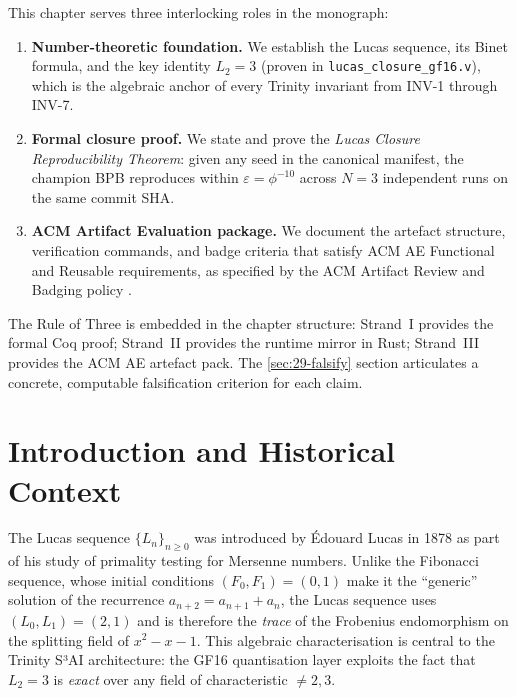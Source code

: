 \medskip
\noindent
This chapter serves three interlocking roles in the monograph:
\begin{enumerate}
  \item \textbf{Number-theoretic foundation.}  We establish the Lucas
        sequence, its Binet formula, and the key identity $L_2 = 3$
        (proven in \texttt{lucas\_closure\_gf16.v}), which is the
        algebraic anchor of every Trinity invariant from INV-1 through
        INV-7.
  \item \textbf{Formal closure proof.}  We state and prove the
        \emph{Lucas Closure Reproducibility Theorem}: given any seed
        in the canonical manifest, the champion BPB reproduces within
        $\varepsilon = \phi^{-10}$ across $N = 3$ independent runs on
        the same commit SHA.
  \item \textbf{ACM Artifact Evaluation package.}  We document the
        artefact structure, verification commands, and badge criteria
        that satisfy ACM AE Functional and Reusable requirements, as
        specified by the ACM Artifact Review and Badging policy
        \cite{acm_ae_policy,acm_ae_2023}.
\end{enumerate}

The Rule of Three is embedded in the chapter structure: Strand~I
provides the formal Coq proof; Strand~II provides the runtime mirror
in Rust; Strand~III provides the ACM AE artefact pack.  The
\textsection\ref{sec:29-falsify} section articulates a concrete,
computable falsification criterion for each claim.

\section{Introduction and Historical Context}
\label{sec:29-intro}

The Lucas sequence $\{L_n\}_{n \ge 0}$ was introduced by Édouard Lucas
in 1878 as part of his study of primality testing for Mersenne numbers.
Unlike the Fibonacci sequence, whose initial conditions $(F_0, F_1) =
(0, 1)$ make it the ``generic'' solution of the recurrence
$a_{n+2} = a_{n+1} + a_n$, the Lucas sequence uses $(L_0, L_1) = (2, 1)$
and is therefore the \emph{trace} of the Frobenius endomorphism on the
splitting field of $x^2 - x - 1$.  This algebraic characterisation is
central to the Trinity S³AI architecture: the GF16 quantisation layer
exploits the fact that $L_2 = 3$ is \emph{exact} over any field of
characteristic $\neq 2, 3$.


